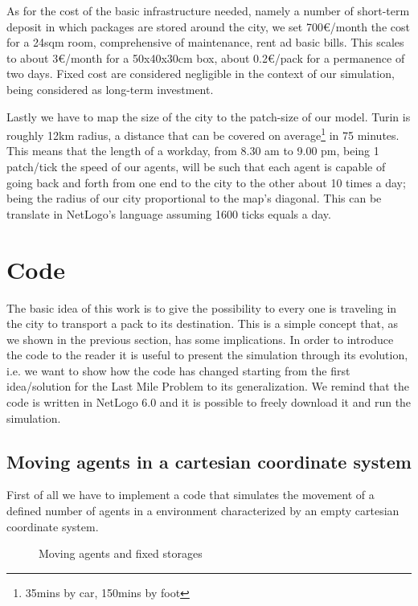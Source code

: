 \documentclass[11pt,a4paper]{article}
\begin{document}
As for the cost of the basic infrastructure needed, namely a number of short-term deposit in which packages are stored around the city, we set 700\euro{}/month the cost for a 24sqm room, comprehensive of maintenance, rent ad basic bills. This scales to about 3\euro{}/month for a 50x40x30cm box, about 0.2\euro{}/pack for a permanence of two days. Fixed cost are considered negligible in the context of our simulation, being considered as long-term investment.

Lastly we have to map the size of the city to the patch-size of our model. Turin is roughly 12km radius, a distance that can be covered on average\footnote{35mins by car, 150mins by foot} in 75 minutes. This means that the length of a workday, from 8.30 am to 9.00 pm, being 1 patch/tick the speed of our agents, will be such that each agent is capable of going back and forth from one end to the city to the other about 10 times a day; being the radius of our city proportional to the map's diagonal. This can be translate in NetLogo's language assuming 1600 ticks equals a day.

\newpage 
\section{Code}
The basic idea of this work is to give the possibility to every one is traveling in the city to transport a pack to its destination. 
This is a simple concept that, as we shown in the previous section, has some implications. In order to introduce the code to the reader it is useful to present the simulation through its evolution, i.e. we want to show how the code has changed starting from the first idea/solution for the Last Mile Problem to its generalization. 
We remind that the code is written in NetLogo 6.0 and it is possible to freely download it and run the simulation.


\subsection{Moving agents in a cartesian coordinate system}
First of all we have to implement a code that simulates the movement of a defined number of agents in a environment characterized by an empty cartesian coordinate system. 

\begin{figure}[h!]
\centering
\caption{Moving agents and fixed storages}
\end{figure}
\end{document}
